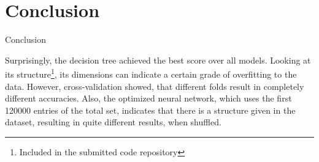 \documentclass[xcolor=svgnames,handout]{beamer}
\begin{document}
\section
  {Conclusion}
\begin{frame}
    {Conclusion}
    
    Surprisingly, the decision tree achieved the best score over all models. Looking at its structure\footnote{Included in the submitted code repository}, its dimensions can indicate a certain grade of overfitting to the data. However, cross-validation showed, that different folds result in completely different accuracies.
    \bigbreak
    Also, the optimized neural network, which uses the first 120000 entries of the total set, indicates that there is a structure given in the dataset, resulting in quite different results, when shuffled.
    
\end{frame}
\end{document}
